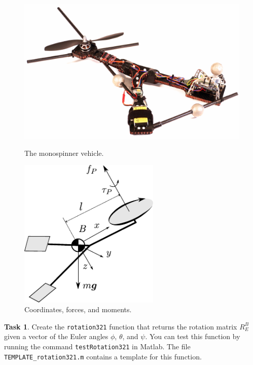 \documentclass{article}
\theoremstyle{definition}
\newtheorem{task}{Task}
\begin{document}
\begin{figure}[h]
\centering
\begin{minipage}{0.9\textwidth}
\begin{minipage}{0.5\textwidth}
        \centering
        \includegraphics[width=\textwidth]{monospinner.pdf}
        \caption{The monospinner vehicle.}
\end{minipage}
\begin{minipage}{0.5\textwidth}
        \centering
        \includegraphics[width=0.6\textwidth]{monospinner-coordinates.pdf}
        \caption{Coordinates, forces, and moments.}
\end{minipage}
\end{minipage}
\end{figure}

\begin{task}
    Create the \texttt{rotation321} function that returns the rotation matrix $R^B_E$ given a vector of the Euler angles $\phi$, $\theta$, and $\psi$. You can test this function by running the command \texttt{testRotation321} in Matlab. The file \texttt{TEMPLATE\_rotation321.m} contains a template for this function.
\end{task}
\end{document}
